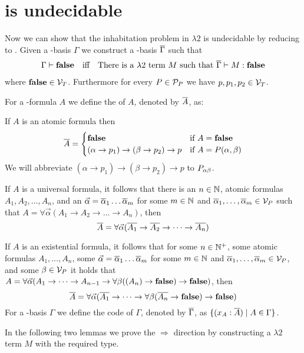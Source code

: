 \section{\lambdaInhab{} is undecidable}
Now we can show that the inhabitation problem in $\lambda2$ %
is undecidable by reducing \PCons{} to \lambdaInhab{}. Given a \SysP-basis $\Gamma$ we construct a \lambdaTwo-basis $\overline{\Gamma}$ such that 
\begin{align*}
\Gamma\vdash\textbf{false}&&\text{iff}&&\text{There is a $\lambda2$ term $M$ such that } \overline{\Gamma}\vdash M:\textbf{false}
\end{align*}
where $\textbf{false}\in\mathcal{V}_T$. Furthermore for every $P\in\mathcal{P}_P$ we have $p,p_1,p_2\in\mathcal{V}_T$. 

\begin{definition}
For a \SysP-formula $A$ we define the  of $A$, denoted by $\overline{A}$, as:

If $A$ is an atomic formula then
\[
\trans{A}=
\begin{cases}
\false &\text{if $A=\false$}\\
(\alpha\to p_1)\to(\beta\to p_2)\to p &\text{if $A=P(\alpha,\beta)$} %
\end{cases}
\]
We will abbreviate $(\alpha\to p_1)\to(\beta\to p_2)\to p$ to $P_{\alpha\beta}$.

If $A$ is a universal formula, it follows that there is an $n\in\mathbb{N}$, atomic formulas $A_1,A_2,\dots,A_n$, and an $\predVec=\predVec[1]\dots\predVec[m]$ for some $m\in\mathbb{N}$ and $\predVec[1],\dots,\predVec[m]\in\VarP$ such that $A=\forall\vec{\alpha}(A_1\to A_2 \to\dots\to A_n)$, then 
\[\trans{A}=\forall\predVec(\trans{A_1}\to \trans{A_2} \to\dots\to\trans{ A_n})\]

If $A$ is an existential formula, it follows that for some $n\in\mathbb{N}^+$, some atomic formulas $A_1,\dots,A_n$, some $\predVec=\predVec[1]\dots\predVec[m]$ for some $m\in\mathbb{N}$ and $\predVec[1],\dots,\predVec[m]\in\VarP$, and some $\beta\in\mathcal{V}_P$ it holds that $A=\forall\vec{\alpha}(A_1 \to\dots\to A_{n-1}\to \forall\beta((A_n)\to\textbf{false})\to\textbf{false})$, then %
\[\trans{A}=\forall\predVec(\trans{A_1}\to\dots\to\forall\beta(\trans{ A_n}\to\false)\to\false)\]
For a \SysP-basis $\Gamma$ we define the code of $\Gamma$, denoted by $\overline{\Gamma}$, as $\{(x_A:\overline{A})\mid A\in\Gamma\}$.
\end{definition}

In the following two lemmas we prove the $\Rightarrow$ direction by constructing a $\lambda2$ term $M$ with the required type.

